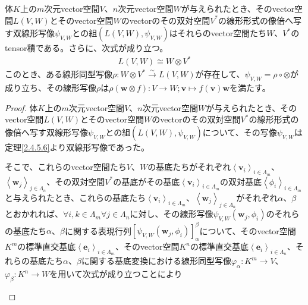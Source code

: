 \documentclass[dvipdfmx]{jsarticle}
\begin{document}
\begin{thm}\label{2.4.5.7}
体$K$上の$m$次元vector空間$V$、$n$次元vector空間$W$が与えられたとき、そのvector空間$L(V,W)$とそのvector空間$W$のvectorのその双対空間$V^{*}$の線形形式の像倍へ写す双線形写像$\psi_{V,W}$との組$\left( L(V,W),\psi_{V,W} \right)$はそれらのvector空間たち$W$、$V^{*}$のtensor積である。さらに、次式が成り立つ。
\begin{align*}
L(V,W) \cong W \otimes V^{*}
\end{align*}
このとき、ある線形同型写像$\rho:W \otimes V^{*}\overset{\sim}{\rightarrow}L(V,W)$が存在して、$\psi_{V,W} = \rho \circ \otimes$が成り立ち、その線形写像$\rho$は$\rho\left( \mathbf{w} \otimes f \right):V \rightarrow W;\mathbf{v} \mapsto f\left( \mathbf{v} \right)\mathbf{w}$を満たす。
\end{thm}
\begin{proof}
体$K$上の$m$次元vector空間$V$、$n$次元vector空間$W$が与えられたとき、そのvector空間$L(V,W)$とそのvector空間$W$のvectorのその双対空間$V^{*}$の線形形式の像倍へ写す双線形写像$\psi_{V,W}$との組$\left( L(V,W),\psi_{V,W} \right)$について、その写像$\psi_{V,W}$は定理\ref{2.4.5.6}より双線形写像であった。\par
そこで、これらのvector空間たち$V$、$W$の基底たちがそれぞれ$\left\langle \mathbf{v}_{i} \right\rangle_{i \in \varLambda_{m}}$、$\left\langle \mathbf{w}_{j} \right\rangle_{j \in \varLambda_{n}}$、その双対空間$V^{*}$の基底がその基底$\left\langle \mathbf{v}_{i} \right\rangle_{i \in \varLambda_{m}}$の双対基底$\left\langle \phi_{i} \right\rangle_{i \in \varLambda_{m}}$と与えられたとき、これらの基底たち$\left\langle \mathbf{v}_{i} \right\rangle_{i \in \varLambda_{m}}$、$\left\langle \mathbf{w}_{j} \right\rangle_{j \in \varLambda_{n}}$がそれぞれ$\alpha$、$\beta$とおかれれば、$\forall i,k \in \varLambda_{m}\forall j \in \varLambda_{n}$に対し、その線形写像$\psi_{V,W}\left( \mathbf{w}_{j},\phi_{i} \right)$のそれらの基底たち$\alpha$、$\beta$に関する表現行列$\left[ \psi_{V,W}\left( \mathbf{w}_{j},\phi_{i} \right) \right]^{\beta}_{\alpha}$について、そのvector空間$K^{m}$の標準直交基底$\left\langle \mathbf{e}_{i} \right\rangle_{i \in \varLambda_{m}}$、そのvector空間$K^{n}$の標準直交基底$\left\langle \mathbf{e}_{i} \right\rangle_{i \in \varLambda_{n}}$、それらの基底たち$\alpha$、$\beta$に関する基底変換における線形同型写像$\varphi_{\alpha}:K^{m} \rightarrow V$、$\varphi_{\beta}:K^{n} \rightarrow W$を用いて次式が成り立つことにより
\begin{center}
\end{center}
\end{proof}
\end{document}
